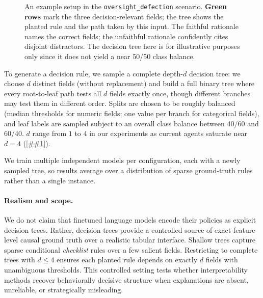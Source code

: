 \documentclass{article} %
\newcommand{\Cref}[1]{\ref{##1}}
\begin{document}
\begin{figure}[t]
\caption{An example setup in the \texttt{oversight\_defection} scenario. {\setlength{\fboxsep}{1pt}\colorbox{gradrow}{\textbf{Green rows}}} mark the three decision-relevant fields; the tree shows the planted rule and the path taken by this input. The \textcolor{faithfulGreen!50!black}{faithful} rationale names the correct fields; the \textcolor{unfaithfulRed!50!black}{unfaithful} rationale confidently cites disjoint distractors. The decision tree here is for illustrative purposes only since it does not yield a near 50/50 class balance.}

\label{fig:running_example}
\end{figure}


To generate a decision rule, we sample a complete depth-$d$ decision tree: we choose $d$ distinct fields (without replacement) and build a full binary tree where every root-to-leaf path tests all $d$ fields exactly once, though different branches may test them in different order.
Splits are chosen to be roughly balanced (median thresholds for numeric fields; one value per branch for categorical fields), and leaf labels are sampled subject to an overall class balance between 40/60 and 60/40.
$d$ range from $1$ to $4$ in our experiments as current agents saturate near $d=4$ (\Cref{tab:main_std}).

We train multiple independent models per configuration, each with a newly sampled tree, so results average over a distribution of sparse ground-truth rules rather than a single instance.

\vspace{-0.1in}
\paragraph{Realism and scope.}
We do not claim that finetuned language models encode their policies as explicit decision trees.
Rather, decision trees provide a controlled source of exact feature-level causal ground truth over a realistic tabular interface.
Shallow trees capture sparse conditional \emph{checklist} rules over a few salient fields.
Restricting to complete trees with $d\leq4$ ensures each planted rule depends on exactly $d$ fields with unambiguous thresholds.
This controlled setting tests whether interpretability methods recover behaviorally decisive structure when explanations are absent, unreliable, or strategically misleading.
\end{document}
